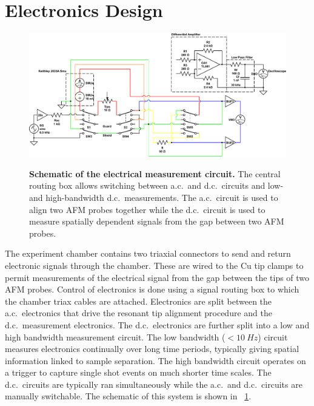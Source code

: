 \documentclass{article}
\begin{document}
\section{Electronics Design}

\begin{figure}[bt]
\centering
{\includegraphics[width=15cm]{figures/tip_experiment_circuit_design}}
{\caption[Schematic of the electrical measurement circuit.]{\textbf{Schematic of the electrical measurement circuit.} The central routing box allows switching between a.c.\ and d.c.\ circuits and low-and high-bandwidth d.c.\ measurements. The a.c.\ circuit is used to align two AFM probes together while the d.c.\ circuit is used to measure spatially dependent signals from the gap between two AFM probes.}
\label{fig:circuit_design}}
\end{figure}

The experiment chamber contains two triaxial connectors to send and return electronic signals through the chamber. These are wired to the Cu tip clamps to permit measurements of the electrical signal from the gap between the tips of two AFM probes. Control of electronics is done using a signal routing box to which the chamber triax cables are attached.
Electronics are split between the a.c.\ electronics that drive the resonant tip alignment procedure and the d.c.\ measurement electronics. The d.c.\ electronics are further split into a low and high bandwidth measurement circuit. The low bandwidth ($<\SI{10}{Hz}$) circuit measures electronics continually over long time periods, typically giving spatial information linked to sample separation. The high bandwidth circuit operates on a trigger to capture single shot events on much shorter time scales. The d.c.\ circuits are typically ran simultaneously while the a.c.\ and d.c.\ circuits are manually switchable. The schematic of this system is shown in \figurename~\ref{fig:circuit_design}.
\end{document}
